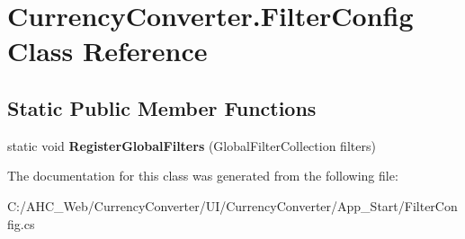 \hypertarget{class_currency_converter_1_1_filter_config}{\section{Currency\-Converter.\-Filter\-Config Class Reference}
\label{class_currency_converter_1_1_filter_config}
}
\subsection*{Static Public Member Functions}
\begin{DoxyCompactItemize}
\item 
\hypertarget{class_currency_converter_1_1_filter_config_a2dd09b604fd07e279c129b3fba397c3c}{static void {\bfseries Register\-Global\-Filters} (Global\-Filter\-Collection filters)}\label{class_currency_converter_1_1_filter_config_a2dd09b604fd07e279c129b3fba397c3c}

\end{DoxyCompactItemize}


The documentation for this class was generated from the following file\-:\begin{DoxyCompactItemize}
\item 
C\-:/\-A\-H\-C\-\_\-\-Web/\-Currency\-Converter/\-U\-I/\-Currency\-Converter/\-App\-\_\-\-Start/Filter\-Config.\-cs\end{DoxyCompactItemize}
